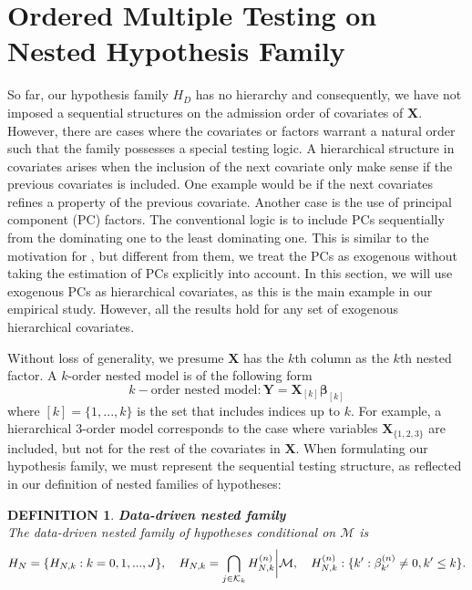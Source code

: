 \documentclass[11pt]{article}
\newcommand{\q}{\text{\quad}}
\newtheorem{definition}{DEFINITION}
\begin{document}
	
	
	\section{Ordered Multiple Testing on Nested Hypothesis Family}\label{sec:ordered}
	
	
	So far, our hypothesis family $H_D$ has no hierarchy and consequently, we have not imposed a sequential structures on the admission order of covariates of $\bm{X}$. However, there are cases where the covariates or factors warrant a natural order such that the family possesses a special testing logic. A hierarchical structure in covariates arises when the inclusion of the next covariate only make sense if the previous covariates is included. One example would be if the next covariates refines a property of the previous covariate. Another case is the use of principal component (PC) factors. The conventional logic is to include PCs sequentially from the dominating one to the least dominating one. This is similar to the motivation for \cite{16-AOS1536}, but different from them, we treat the PCs as exogenous without taking the estimation of PCs explicitly into account. In this section, we will use exogenous PCs as hierarchical covariates, as this is the main example in our empirical study. However, all the results hold for any set of exogenous hierarchical covariates.
	
	
	
	Without loss of generality, we presume $\bm{X}$ has the $k$th column as the $k$th nested factor. A $k$-order nested model is of the following form
	\begin{equation}
		k-\text{order nested model}: \bm{Y}=\bm{X}_{[k]}\bm{\beta}_{[k]}
	\end{equation}
	where $[k]=\{1,...,k\}$ is the set that includes indices up to $k$. For example, a hierarchical 3-order model corresponds to the case where variables $\bm{X}_{\{1,2,3\}}$ are included, but not for the rest of the covariates in $\bm{X}$. When formulating our hypothesis family, we must represent the sequential testing structure, as reflected in our definition of nested families of hypotheses:
	\begin{definition}{\bf Data-driven nested family}\label{def9}\\
		The data-driven nested family of hypotheses conditional on $\mathcal{M}$ is
		\begin{equation}
			H_{N}=\{H_{N,k}:k=0,1,...,J\},\q
			H_{N,k}=	\bigcap_{j\in\mathcal{K}_k}
			H_{N,k}^{(n)}\bigg\rvert \mathcal{M},\q
			H_{N,k}^{(n)}:\{k':\beta_{k'}^{(n)}\neq 0,k'\leq k\}.
		\end{equation}
	\end{definition}
	
\end{document}
